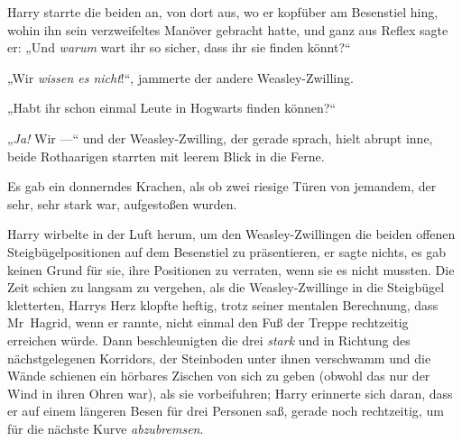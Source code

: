 Harry starrte die beiden an, von dort aus, wo er kopfüber am Besenstiel hing, wohin ihn sein verzweifeltes Manöver gebracht hatte, und ganz aus Reflex sagte er:
„Und \emph{warum} wart ihr so sicher, dass ihr sie finden könnt?“

„Wir \emph{wissen es nicht}!“, jammerte der andere Weasley-Zwilling.

„Habt ihr schon einmal Leute in Hogwarts finden können?“

„\emph{Ja!} Wir —“ und der Weasley-Zwilling, der gerade sprach, hielt abrupt inne, beide Rothaarigen starrten mit leerem Blick in die Ferne.

Es gab ein donnerndes Krachen, als ob zwei riesige Türen von jemandem, der sehr, sehr stark war, aufgestoßen wurden.

Harry wirbelte in der Luft herum, um den Weasley-Zwillingen die beiden offenen Steigbügelpositionen auf dem Besenstiel zu präsentieren, er sagte nichts, es gab keinen Grund für sie, ihre Positionen zu verraten, wenn sie es nicht mussten. Die Zeit schien zu langsam zu vergehen, als die Weasley-Zwillinge in die Steigbügel kletterten, Harrys Herz klopfte heftig, trotz seiner mentalen Berechnung, dass Mr~Hagrid, wenn er rannte, nicht einmal den Fuß der Treppe rechtzeitig erreichen würde. Dann beschleunigten die drei \emph{stark} und in Richtung des nächstgelegenen Korridors, der Steinboden unter ihnen verschwamm und die Wände schienen ein hörbares Zischen von sich zu geben (obwohl das nur der Wind in ihren Ohren war), als sie vorbeifuhren; Harry erinnerte sich daran, dass er auf einem längeren Besen für drei Personen saß, gerade noch rechtzeitig, um für die nächste Kurve \emph{abzubremsen}.

